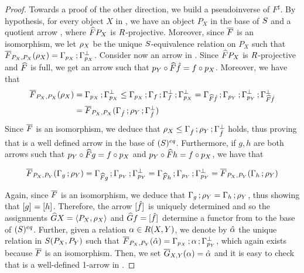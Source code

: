 \begin{proof}
\medskip 

Towards a proof of the other direction, 
we build a pseudoinverse of $F^\sharp$. 
By hypothesis, 
for every object $X$ in \CC, we have an object $P_X$ in the base of $S$ and 
a quotient arrow , where $\widehat{F}P_X$ is $R$-projective.
Moreover, since $\overline{F}$ is an isomorphism, 
we let $\rho_X$ be the unique $S$-equivalence relation on $P_X$ such that 
$\overline{F}_{P_X,P_X}(\rho_X) = \Gamma_{p_X}\mathop{\mathbf{;}}\Gamma_{p_X}^{\bot}$. 
% 
Consider now an arrow  in \CC. 
Since $\widehat{F}P_X$ is $R$-projective and $\widehat{F}$ is full, we get an arrow  such that 
$p_Y\circ\widehat{F}\hat{f} = f\circ p_X$. 
Moreover, we have that 
\begin{align*} 
\overline{F}_{P_X,P_X}(\rho_X) 
  & = \Gamma_{p_X}\mathop{\mathbf{;}}\Gamma_{p_X}^{\bot} 
    \leq \Gamma_{p_X}\mathop{\mathbf{;}}\Gamma_{f}\mathop{\mathbf{;}}\Gamma_{f}^{\bot}\mathop{\mathbf{;}}\Gamma_{p_X}^{\bot} 
    = \Gamma_{\widehat{F}\hat f}\mathop{\mathbf{;}}\Gamma_{p_Y}\mathop{\mathbf{;}}\Gamma_{p_Y}^{\bot}\mathop{\mathbf{;}}\Gamma_{\widehat{F}\hat f}^{\bot} 
\\
  & = \overline{F}_{P_X,P_X}(\Gamma_{\hat f}\mathop{\mathbf{;}}\rho_Y\mathop{\mathbf{;}}\Gamma_{\hat f}^{\bot}) 
\end{align*} 
Since $\overline{F}$ is an isomorphism, we deduce that 
$\rho_X\leq\Gamma_{\hat f}\mathop{\mathbf{;}}\rho_Y\mathop{\mathbf{;}}\Gamma_{\hat f}^{\bot}$ holds, 
thus proving that  is a well defined arrow in the base of $(S)^{eq}$. 
Furthermore, if $g,h$ are both arrows such that $p_Y\circ \widehat{F}g = f\circ p_X$ and $p_Y\circ \widehat{F}h = f\circ p_X$,  we have that 

\[
\overline{F}_{P_X,P_Y}(\Gamma_{g}\mathop{\mathbf{;}}\rho_Y) 
   = \Gamma_{\widehat{F}g}\mathop{\mathbf{;}}\Gamma_{p_Y}\mathop{\mathbf{;}}\Gamma_{p_Y}^{\bot} 
    = \Gamma_{\widehat{F}h}\mathop{\mathbf{;}}\Gamma_{p_Y}\mathop{\mathbf{;}}\Gamma_{p_Y}^{\bot} 
 = \overline{F}_{P_X,P_Y}(\Gamma_{h}\mathop{\mathbf{;}}\rho_Y)
\]

Again, since $\overline{F}$ is an isomorphism, we deduce that 
$\Gamma_{g}\mathop{\mathbf{;}}\rho_Y = \Gamma_{h}\mathop{\mathbf{;}}\rho_Y$, 
thus showing that $[g]_{} = [h]_{}$. 
Therefore, the arrow $[\hat f]_{}$ is uniquely determined and so  the assignments 
$\widehat{G}X = {\langle P_X,\rho_X \rangle }$ and $\widehat{G}f = [\hat f]_{}$ determine a functor from \CC to the base of $(S)^{eq}$. 
% 
Further, given a relation $\alpha\in R(X,Y)$, we denote by $\hat{\alpha}$ the unique relation in $S(P_X,P_Y)$ such that $\overline{F}_{P_X,P_Y}(\hat{\alpha}) = \Gamma_{p_X}\mathop{\mathbf{;}}\alpha\mathop{\mathbf{;}}\Gamma_{p_Y}^{\bot}$, which again exists because $\overline{F}$ is an isomorphism. 
Then, we set $\overline{G}_{X,Y}(\alpha) = \hat{\alpha}$ and 
it is easy to check that  is a well-defined 1-arrow in \RDtn. 
 

\end{proof}
